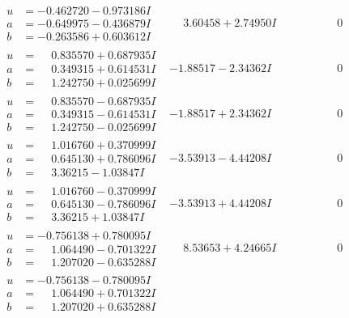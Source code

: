 \documentclass[1p]{elsarticle_modified}
\theoremstyle{definition}
\begin{document}
$$\begin{array}{c|c|c}
\begin{aligned}
u &= -0.462720 - 0.973186 I \\
a &= -0.649975 - 0.436879 I \\
b &= -0.263586 + 0.603612 I\end{aligned}
 & \phantom{-}3.60458 + 2.74950 I & \phantom{-0.000000 } 0 \\ \hline\begin{aligned}
u &= \phantom{-}0.835570 + 0.687935 I \\
a &= \phantom{-}0.349315 + 0.614531 I \\
b &= \phantom{-}1.242750 + 0.025699 I\end{aligned}
 & -1.88517 - 2.34362 I & \phantom{-0.000000 } 0 \\ \hline\begin{aligned}
u &= \phantom{-}0.835570 - 0.687935 I \\
a &= \phantom{-}0.349315 - 0.614531 I \\
b &= \phantom{-}1.242750 - 0.025699 I\end{aligned}
 & -1.88517 + 2.34362 I & \phantom{-0.000000 } 0 \\ \hline\begin{aligned}
u &= \phantom{-}1.016760 + 0.370999 I \\
a &= \phantom{-}0.645130 + 0.786096 I \\
b &= \phantom{-}3.36215 - 1.03847 I\end{aligned}
 & -3.53913 - 4.44208 I & \phantom{-0.000000 } 0 \\ \hline\begin{aligned}
u &= \phantom{-}1.016760 - 0.370999 I \\
a &= \phantom{-}0.645130 - 0.786096 I \\
b &= \phantom{-}3.36215 + 1.03847 I\end{aligned}
 & -3.53913 + 4.44208 I & \phantom{-0.000000 } 0 \\ \hline\begin{aligned}
u &= -0.756138 + 0.780095 I \\
a &= \phantom{-}1.064490 - 0.701322 I \\
b &= \phantom{-}1.207020 - 0.635288 I\end{aligned}
 & \phantom{-}8.53653 + 4.24665 I & \phantom{-0.000000 } 0 \\ \hline\begin{aligned}
u &= -0.756138 - 0.780095 I \\
a &= \phantom{-}1.064490 + 0.701322 I \\
b &= \phantom{-}1.207020 + 0.635288 I\end{aligned}

\end{array}$$
\end{document}
